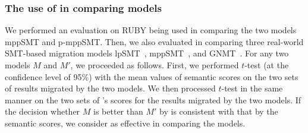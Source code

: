 \subsubsection{The use of {\model} in comparing models}
We performed an evaluation on RUBY being used in comparing the two
models mppSMT and p-mppSMT.
%
Then, we also evaluated {\model} in comparing three real-world
SMT-based migration models lpSMT~\cite{fse13}, mppSMT~\cite{ase15},
and GNMT~\cite{gnmt}.  
%
For any two models $M$ and $M'$, we proceeded as follows. First, we
performed $t$-test (at the confidence level of 95\%) with the mean
values of semantic scores on the two sets of results migrated by the
two models. We then processed $t$-test in the same manner on the two
sets of {\model}'s scores for the results migrated by the two
models. If the decision whether $M$ is better than $M'$ by {\model} is
consistent with that by the semantic scores, we consider {\model} as
effective in comparing the models.



